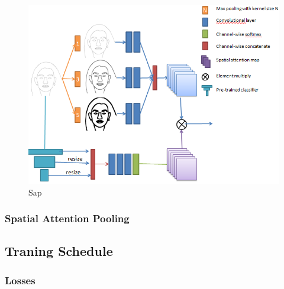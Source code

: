 % 
\begin{figure}
	\includegraphics[width=\columnwidth]{figs/sap.png}
	\caption{Sap}
	\label{fig:sap}
\end{figure}
%

\subsubsection{Spatial Attention Pooling}
\label{subsec:algorithm_sap}


\subsection{Traning Schedule}
\label{subsec:training}


\subsubsection{Losses}
\label{subsec:algorithm_loss}



